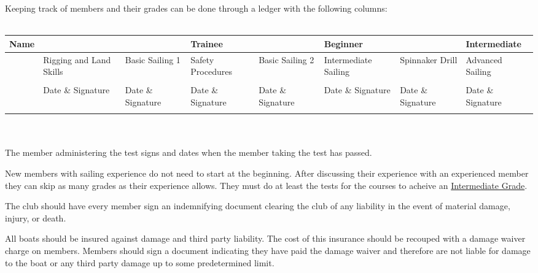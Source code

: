 \documentclass[12pt]{scrartcl}
\begin{document}
\newpage

\begin{landscape}

Keeping track of members and their grades can be done through a ledger with the following columns:
\\
\\
\label{tab:ledger}
\begin{tabularx}{670pt}{|X|X|X|X|X|X|X|X|}
	\hline
	Name & & & Trainee & & Beginner & & Intermediate \\
	\hline
	& Rigging and \newline Land Skills & Basic \newline Sailing 1 & Safety \newline Procedures & Basic \newline Sailing 2 & Intermediate Sailing & Spinnaker Drill & Advanced Sailing \\
	& & & & & & & \\
	& Date \& \newline Signature &  Date \& \newline Signature & Date \& \newline Signature & Date \& \newline Signature & Date \& \newline Signature & Date \& \newline Signature & Date \& \newline Signature \\
	\hline
	& & & & & & & \\
\end{tabularx}
\\
\\
The member administering the test signs and dates when the member taking the test has passed.

\end{landscape}

New members with sailing experience do not need to start at the beginning. After discussing their experience with an experienced member they can skip as many grades as their experience allows. They must do at least the tests for the courses to acheive an \hyperlink{grade:intermediate}{Intermediate Grade}.

The club should have every member sign an indemnifying document clearing the club of any liability in the event of material damage, injury, or death.

All boats should be insured against damage and third party liability. The cost of this insurance should be recouped with a damage waiver charge on members. Members should sign a document indicating they have paid the damage waiver and therefore are not liable for damage to the boat or any third party damage up to some predetermined limit.
\end{document}
